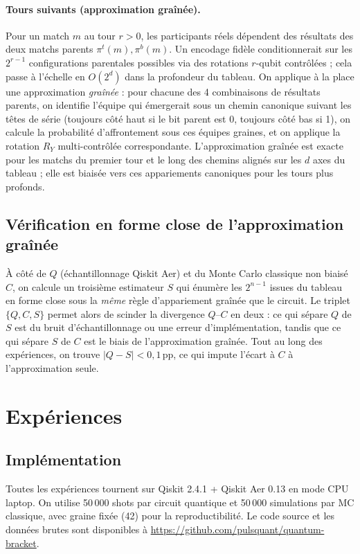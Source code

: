 \documentclass[11pt]{article}
\begin{document}
\paragraph{Tours suivants (approximation graînée).} Pour un match $m$
au tour $r > 0$, les participants réels dépendent des résultats des
deux matchs parents $\pi^t(m), \pi^b(m)$. Un encodage fidèle
conditionnerait sur les $2^{r-1}$ configurations parentales possibles
via des rotations $r$-qubit contrôlées ; cela passe à l'échelle en
$O(2^d)$ dans la profondeur du tableau. On applique à la place une
approximation \emph{graînée} : pour chacune des 4 combinaisons de
résultats parents, on identifie l'équipe qui émergerait sous un chemin
canonique suivant les têtes de série (toujours côté haut si le bit
parent est 0, toujours côté bas si 1), on calcule la probabilité
d'affrontement sous ces équipes graines, et on applique la rotation
$R_Y$ multi-contrôlée correspondante. L'approximation graînée est
exacte pour les matchs du premier tour et le long des chemins alignés
sur les $d$ axes du tableau ; elle est biaisée vers ces appariements
canoniques pour les tours plus profonds.

\subsection{Vérification en forme close de l'approximation graînée}

À côté de $Q$ (échantillonnage Qiskit Aer) et du Monte Carlo classique
non biaisé $C$, on calcule un troisième estimateur $S$ qui énumère les
$2^{n-1}$ issues du tableau en forme close sous la \emph{même} règle
d'appariement graînée que le circuit. Le triplet $\{Q, C, S\}$ permet
alors de scinder la divergence $Q$--$C$ en deux : ce qui sépare $Q$ de
$S$ est du bruit d'échantillonnage ou une erreur d'implémentation,
tandis que ce qui sépare $S$ de $C$ est le biais de l'approximation
graînée. Tout au long des expériences, on trouve $|Q - S| < 0{,}1$\,pp,
ce qui impute l'écart à $C$ à l'approximation seule.

\section{Expériences}
\label{sec:experiments}

\subsection{Implémentation}

Toutes les expériences tournent sur Qiskit 2.4.1 + Qiskit Aer 0.13 en
mode CPU laptop. On utilise 50\,000 shots par circuit quantique et
50\,000 simulations par MC classique, avec graine fixée (42) pour la
reproductibilité. Le code source et les données brutes sont
disponibles à \url{https://github.com/pulsquant/quantum-bracket}.
\end{document}
